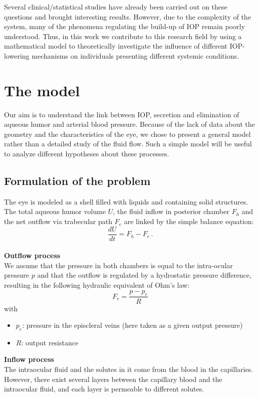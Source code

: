 \documentclass[english,12pt]{article}
\begin{document}
Several clinical/statistical studies have already been carried out on these questions and brought interesting results. However, due to the complexity of the system, many of the phenomena regulating the build-up of IOP remain poorly understood. Thus, in this work we contribute to this research field by using a mathematical model to theoretically investigate the influence of different IOP-lowering mechanisms on individuals presenting different systemic conditions.
 
\section{The model}\label{s3}
Our aim is to understand the link between IOP, secretion and elimination of aqueous humor and arterial blood pressure.
Because of the lack of data about the geometry and the characteristics of the eye, we chose to present a general model rather than a detailed study of the fluid flow. Such a simple model will be useful to analyze different hypotheses about these processes.
\subsection{Formulation of the problem}
 The eye is modeled as a shell filled with liquids and containing solid structures. 
 The total aqueous humor volume $U$, 
 the fluid inflow in posterior chamber $F_h$ and
 the net outflow via trabecular path $F_e$ are linked by the simple balance equation:
\begin{equation}
\frac{dU}{dt}=F_{h}-F_{e}\,.
\label{e1}
\end{equation}
\\
\textbf{Outflow process}\\
We assume that the pressure in both chambers is equal to the intra-ocular pressure $p$ and that the outflow is regulated by a hydrostatic pressure difference, resulting in the following hydraulic equivalent of Ohm's law:
\begin{equation}
F_{e}= \frac{p-p_{e}}{R}
\label{e2}
\end{equation}
with
\begin{itemize}
\item $p_e$: pressure in the episcleral veins (here taken as a given output pressure)
\item $R$: output resistance
\end{itemize}
\textbf{Inflow process}\\
The intraocular fluid and the solutes in it come from the blood in the capillaries. However, there exist several layers between the capillary blood and the intraocular fluid, and each layer is permeable to different solutes. 
\end{document}

